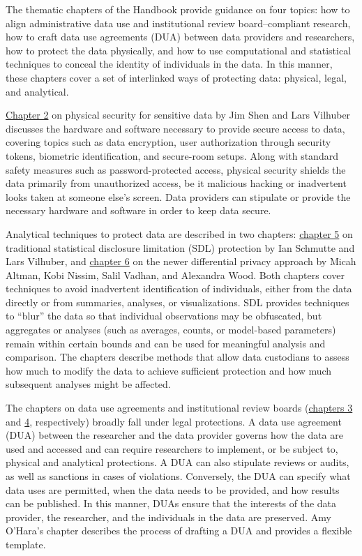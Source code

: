 The thematic chapters of the Handbook provide guidance on four topics: how to align administrative data use and institutional review board--compliant research, how to craft data use agreements (DUA) between data providers and researchers, how to protect the data physically, and how to use computational and statistical techniques to conceal the identity of individuals in the data. In this manner, these chapters cover a set of interlinked ways of protecting data: physical, legal, and analytical.

\protect\hyperlink{security}{Chapter 2} on physical security for sensitive data by Jim Shen and Lars Vilhuber discusses the hardware and software necessary to provide secure access to data, covering topics such as data encryption, user authorization through security tokens, biometric identification, and secure-room setups. Along with standard safety measures such as password-protected access, physical security shields the data primarily from unauthorized access, be it malicious hacking or inadvertent looks taken at someone else's screen. Data providers can stipulate or provide the necessary hardware and software in order to keep data secure.

Analytical techniques to protect data are described in two chapters: \protect\hyperlink{discavoid}{chapter 5} on traditional statistical disclosure limitation (SDL) protection by Ian Schmutte and Lars Vilhuber, and \protect\hyperlink{diffpriv}{chapter 6} on the newer differential privacy approach by Micah Altman, Kobi Nissim, Salil Vadhan, and Alexandra Wood. Both chapters cover techniques to avoid inadvertent identification of individuals, either from the data directly or from summaries, analyses, or visualizations. SDL provides techniques to ``blur'' the data so that individual observations may be obfuscated, but aggregates or analyses (such as averages, counts, or model-based parameters) remain within certain bounds and can be used for meaningful analysis and comparison. The chapters describe methods that allow data custodians to assess how much to modify the data to achieve sufficient protection and how much subsequent analyses might be affected.

The chapters on data use agreements and institutional review boards (\protect\hyperlink{dua}{chapters 3} and \protect\hyperlink{irb}{4}, respectively) broadly fall under legal protections. A data use agreement (DUA) between the researcher and the data provider governs how the data are used and accessed and can require researchers to implement, or be subject to, physical and analytical protections. A DUA can also stipulate reviews or audits, as well as sanctions in cases of violations. Conversely, the DUA can specify what data uses are permitted, when the data needs to be provided, and how results can be published. In this manner, DUAs ensure that the interests of the data provider, the researcher, and the individuals in the data are preserved. Amy O'Hara's chapter describes the process of drafting a DUA and provides a flexible template.

